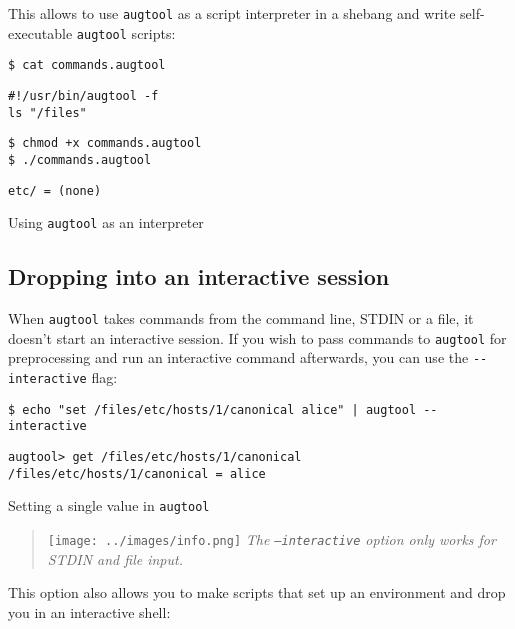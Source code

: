 This allows to use \verb!augtool! as a script interpreter in a shebang and write self-executable \verb!augtool! scripts:

\begin{listing}
  \begin{verbatim}
$ cat commands.augtool
  \end{verbatim}
  \begin{verbatim}
#!/usr/bin/augtool -f
ls "/files"
  \end{verbatim}
  \begin{verbatim}
$ chmod +x commands.augtool
$ ./commands.augtool
  \end{verbatim}
  \begin{verbatim}
etc/ = (none)
  \end{verbatim}
  \caption{Using \texttt{augtool} as an interpreter}
  \label{lst:augtool_interpreter}
\end{listing}

\subsection{Dropping into an interactive session}

When \verb!augtool! takes commands from the command line, STDIN or a file, it doesn't start an interactive session. If you wish to pass commands to \verb!augtool! for preprocessing and run an interactive command afterwards, you can use the \verb!--interactive! flag:

  

\begin{listing}
  \begin{verbatim}
$ echo "set /files/etc/hosts/1/canonical alice" | augtool --interactive
  \end{verbatim}
  \begin{verbatim}
augtool> get /files/etc/hosts/1/canonical
/files/etc/hosts/1/canonical = alice
  \end{verbatim}
  \caption{Setting a single value in \texttt{augtool}}
  \label{lst:augtool_set_single}
\end{listing}

\begin{quote}
\texttt{[image: ../images/info.png]} \emph{The \texttt{--interactive} option only works for STDIN and file input.}

\end{quote}
This option also allows you to make scripts that set up an environment and drop you in an interactive shell:

